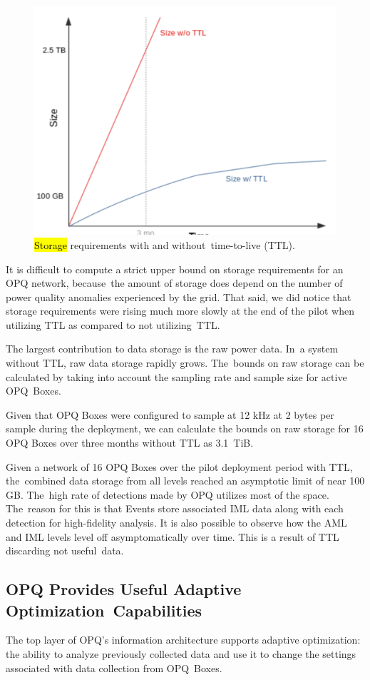 \documentclass[energies,article,accept,moreauthors,pdftex]{Definitions/mdpi}
\begin{document}
\begin{figure}[H]
\centering
\includegraphics[width=0.4\linewidth]{images/pilot/data-management-graph.png}
\caption{\hl{Storage} requirements with and without~time-to-live (TTL).} %
\label{fig:data-management-graph}
\end{figure}

It is difficult to compute a strict upper bound on storage requirements for an OPQ network, because~the amount of storage does depend on the number of power quality anomalies experienced by the grid. That said, we did notice that storage requirements were rising much more slowly at the end of the pilot when utilizing TTL as compared to not utilizing~TTL.

The largest contribution to data storage is the raw power data. In~a system without TTL, raw data storage rapidly grows. The~bounds on raw storage can be calculated by taking into account the sampling rate and sample size for active OPQ~Boxes.

Given that OPQ Boxes were configured to sample at 12 kHz at 2 bytes per sample during the deployment, we can calculate the bounds on raw storage for 16 OPQ Boxes over three months without TTL as 3.1~TiB.

Given a network of 16 OPQ Boxes over the pilot deployment period with TTL, the~combined data storage from all levels reached an asymptotic limit of near 100 GB. The~high rate of detections made by OPQ utilizes most of the space. The~reason for this is that Events store associated IML data along with each detection for high-fidelity analysis. It is also possible to observe how the AML and IML levels level off asymptomatically over time. This is a result of TTL discarding not useful~data.

\subsection{OPQ Provides Useful Adaptive Optimization~Capabilities}
\label{sec:adaptive-optimization}

The top layer of OPQ's information architecture supports adaptive optimization: the ability to analyze previously collected data and use it to change the settings associated with data collection from OPQ~Boxes.
\end{document}
